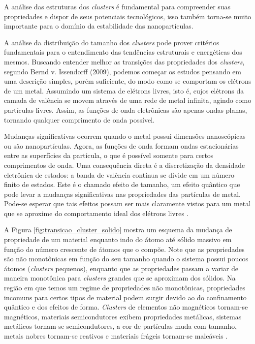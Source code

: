  A análise das estruturas dos \textit{clusters} é fundamental para compreender suas propriedades e  dispor de seus potenciais tecnológicos, isso também torna-se muito importante para o domínio da estabilidade das nanopartículas. 


A análise da distribuição do tamanho dos \textit{clusters} pode prover critérios fundamentais para o entendimento das tendências estruturais e energéticas dos mesmos. Buscando entender melhor as transições das propriedades dos \textit{clusters}, segundo Bernd v. Issendorff (2009), podemos começar os estudos pensando em uma descrição simples, porém suficiente, do modo como se comportam os elétrons de um metal. Assumindo um sistema de elétrons livres, isto é, cujos elétrons da camada de valência se movem através de uma rede de metal infinita, agindo como partículas livres. Assim, as funções de onda eletrônicas são apenas ondas planas, tornando qualquer comprimento de onda possível.

Mudanças significativas ocorrem quando o metal possui dimensões nanoscópicas ou são nanopartículas. Agora, as funções de onda formam ondas estacionárias entre as superfícies da partícula, o que é possível somente para certos comprimentos de onda. Uma consequência direta é a discretização da densidade eletrônica de estados: a banda de valência contínua se divide em um número finito de estados. Este é o chamado efeito de tamanho, um efeito quântico que pode levar a mudanças significativas nas propriedades das partículas de metal. Pode-se esperar que tais efeitos possam ser mais claramente vistos para um metal que se aproxime do comportamento ideal dos elétrons livres \cite{capitulo_livro_shell}.

A Figura \ref{fig:transicao_cluster_solido} mostra um esquema da mudança de propriedade de um material enquanto indo do átomo até sólido massivo em função do número crescente de átomos que o compõe. Note que as propriedades são não monotônicas em função do seu tamanho quando o sistema possui poucos átomos (\textit{clusters} pequenos), enquanto que as propriedades passam a variar de maneira  monotônica para \textit{clusters} grandes que se aproximam dos sólidos. Na região em que temos um regime de propriedades não monotônicas, propriedades incomuns para certos tipos de material podem surgir devido ao do confinamento quântico e dos efeitos de forma. \textit{Clusters} de elementos não magnéticos tornam-se magnéticos, materiais semicondutores exibem propriedades metálicas, sistemas metálicos tornam-se semicondutores, a cor de partículas muda com tamanho, metais nobres tornam-se reativos e materiais frágeis tornam-se maleáveis \cite{cap06_Nanophysics}. 

